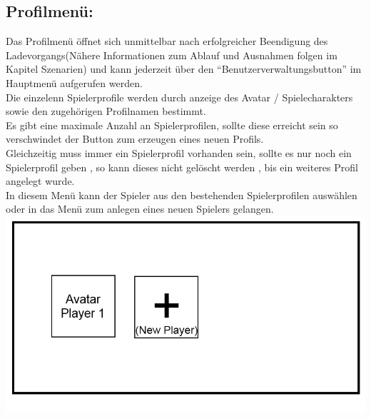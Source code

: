 \documentclass{scrartcl}
\begin{document}
\begin{enumerate}
\begin{minipage}{1\textwidth}
		\item \subsection*{Profilmenü:} \label{appaufbau:Profilmenue}
		Das Profilmenü öffnet sich unmittelbar nach erfolgreicher Beendigung des Ladevorgangs(Nähere Informationen zum Ablauf und Ausnahmen folgen im Kapitel Szenarien) und kann jederzeit über den \enquote{Benutzerverwaltungsbutton} im Hauptmenü aufgerufen werden.\\
		Die einzelenn Spielerprofile werden durch anzeige des Avatar / Spielecharakters sowie den zugehörigen Profilnamen bestimmt.\\
		Es gibt eine maximale Anzahl an Spielerprofilen, sollte diese erreicht sein so verschwindet der Button zum erzeugen eines neuen Profils.\\
		Gleichzeitig muss immer ein Spielerprofil vorhanden sein, sollte es nur noch ein Spielerprofil geben , so kann dieses nicht gelöscht werden , bis ein weiteres Profil angelegt wurde.\\
		In diesem Menü kann der Spieler aus den bestehenden Spielerprofilen auswählen oder in das Menü zum anlegen eines neuen Spielers gelangen.\\
		\includegraphics[scale=0.5]{assets/PlayerScreen}
	\end{minipage}
	

\end{enumerate}
\end{document}
